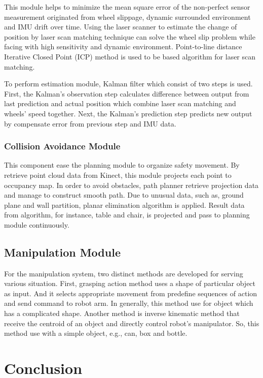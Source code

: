\documentclass{llncs}
\begin{document}
This module helps to minimize the mean square error of the non-perfect sensor measurement originated from wheel slippage, dynamic surrounded environment and IMU drift over time. Using the laser scanner to estimate the change of position by laser scan matching technique can solve the wheel slip problem while facing with high sensitivity and dynamic environment. Point-to-line distance Iterative Closed Point (ICP) method is used to be based algorithm for laser scan matching.

To perform estimation module, Kalman filter which consist of two steps is used. First, the Kalman's observation step calculates difference between output from last prediction and actual position which combine laser scan matching and wheels' speed together. Next, the Kalman's prediction step predicts new output by compensate error from previous step and IMU data\cite{odom}.

\subsubsection{Collision Avoidance Module}

This component ease the planning module to organize safety movement. By retrieve point cloud data from Kinect, this module projects each point to occupancy map. In order to avoid obstacles, path planner retrieve projection data and manage to construct smooth path. Due to unusual data, such as, ground plane and wall partition, planar elimination algorithm is applied. Result data from algorithm, for instance, table and chair, is projected and pass to planning module continuously\cite{avoid}.

\subsection{Manipulation Module}

For the manipulation system, two distinct methods are developed for serving various situation. First, grasping action method uses a shape of particular object as input. And it selects appropriate movement from predefine sequences of action and send command to robot arm. In generally, this method use for object which has a complicated shape. Another method is inverse kinematic method that receive the centroid of an object and directly control robot's manipulator. So, this method use with a simple object, e.g., can, box and bottle.

\section{Conclusion}
\end{document}
